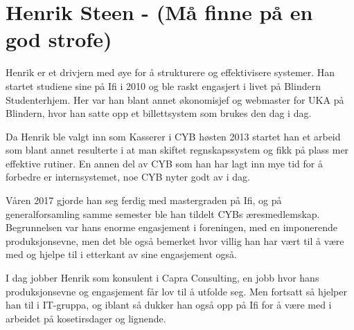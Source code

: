 \chapter[Henrik Steen]{Henrik Steen - (Må finne på en god strofe)}

Henrik er et drivjern med øye for å strukturere og effektivisere systemer. Han startet studiene sine på Ifi i 2010 og ble raskt engasjert i livet på Blindern Studenterhjem. Her var han blant annet økonomisjef og webmaster for UKA på Blindern, hvor han satte opp et billettsystem som brukes den dag i dag.

Da Henrik ble valgt inn som Kasserer i CYB høsten 2013 startet han et arbeid som blant annet resulterte i at man skiftet regnskapssystem og fikk på plass mer effektive rutiner. En annen del av CYB som han har lagt inn mye tid for å forbedre er internsystemet, noe CYB nyter godt av i dag.

Våren 2017 gjorde han seg ferdig med mastergraden på Ifi, og på generalforsamling samme semester ble han tildelt CYBs æresmedlemskap. Begrunnelsen var hans enorme engasjement i foreningen, med en imponerende produksjonsevne, men det ble også bemerket hvor villig han har vært til å være med og hjelpe til i etterkant av sine engasjement også.

I dag jobber Henrik som konsulent i Capra Consulting, en jobb hvor hans produksjonsevne og engasjement får lov til å utfolde seg. Men fortsatt så hjelper han til i IT-gruppa, og iblant så dukker han også opp på Ifi for å være med i arbeidet på kosetirsdager og lignende.
